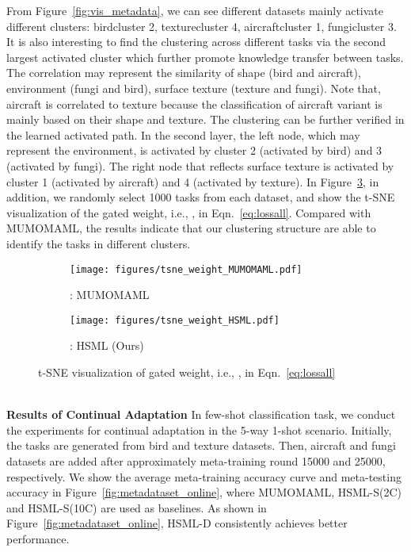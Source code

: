 \documentclass{article}
\begin{document}
From Figure~\ref{fig:vis_metadata}, we can see different datasets mainly activate different clusters: birdcluster 2, texturecluster 4, aircraftcluster 1, fungicluster 3. It is also interesting to find the clustering across different tasks via the second largest activated cluster which further promote knowledge transfer between tasks. The correlation may represent the similarity of shape (bird and aircraft), environment (fungi and bird), surface texture (texture and fungi). Note that, aircraft is correlated to texture because the classification of aircraft variant is mainly based on their shape and texture. The clustering can be further verified in the learned activated path. In the second layer, the left node, which may represent the environment, is activated by cluster 2 (activated by bird) and 3 (activated by fungi). The right node that reflects surface texture is activated by cluster 1 (activated by aircraft) and 4 (activated by texture). In Figure~\ref{fig:tsne_weight}, in addition, we randomly select 1000 tasks from each dataset, and show the t-SNE~\cite{maaten2008visualizing} visualization of the gated weight, i.e., , in Eqn.~\eqref{eq:lossall}. Compared with MUMOMAML, the results indicate that our clustering structure are able to identify the tasks in different clusters.
\begin{figure}[h]
	\centering
	\begin{subfigure}[b]{0.235\textwidth}
		\centering
		\texttt{[image: figures/tsne\_weight\_MUMOMAML.pdf]}
		\caption{\label{fig:sinfunc}: MUMOMAML}
	\end{subfigure}
	\begin{subfigure}[b]{0.235\textwidth}
		\centering
		\texttt{[image: figures/tsne\_weight\_HSML.pdf]}
		\caption{\label{fig:linefunc}: HSML (Ours)}
	\end{subfigure}
	\caption{t-SNE visualization of gated weight, i.e., , in Eqn.~\eqref{eq:lossall}}
	\label{fig:tsne_weight}
\end{figure}
\\
\textbf{Results of Continual Adaptation}
In few-shot classification task, we conduct the experiments for continual adaptation in the 5-way 1-shot scenario. Initially, the tasks are generated from bird and texture datasets. Then, aircraft and fungi datasets are added after approximately meta-training round 15000 and 25000, respectively. We show the average meta-training accuracy curve and meta-testing accuracy in Figure~\ref{fig:metadataset_online}, where MUMOMAML, HSML-S(2C) and HSML-S(10C) are used as baselines. As shown in Figure~\ref{fig:metadataset_online}, HSML-D consistently achieves better performance.
\end{document}
